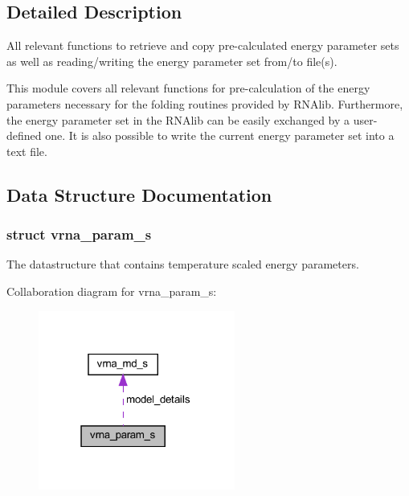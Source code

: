 \subsection{Detailed Description}
All relevant functions to retrieve and copy pre-\/calculated energy parameter sets as well as reading/writing the energy parameter set from/to file(s). 

This module covers all relevant functions for pre-\/calculation of the energy parameters necessary for the folding routines provided by R\+N\+Alib. Furthermore, the energy parameter set in the R\+N\+Alib can be easily exchanged by a user-\/defined one. It is also possible to write the current energy parameter set into a text file. 

\subsection{Data Structure Documentation}
\label{structvrna__param__s}
\subsubsection{struct vrna\+\_\+param\+\_\+s}
The datastructure that contains temperature scaled energy parameters. 

Collaboration diagram for vrna\+\_\+param\+\_\+s\+:
\nopagebreak
\begin{figure}[H]
\begin{center}
\leavevmode
\includegraphics[width=183pt]{structvrna__param__s__coll__graph}
\end{center}
\end{figure}
